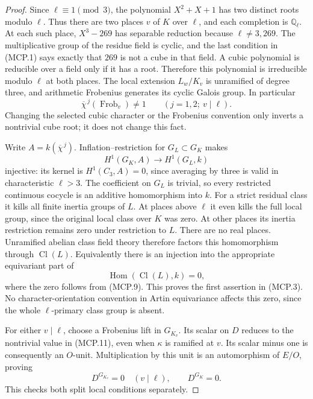 \begin{proof}
Since $\ell\equiv1\pmod3$, the polynomial $X^2+X+1$ has
two distinct roots modulo $\ell$.  Thus there are two places
$v$ of $K$ over $\ell$, and each completion is $\mathbb Q_\ell$.
At each such place, $X^3-269$ has separable reduction because
$\ell\ne3,269$.  The multiplicative group of the residue field
is cyclic, and the last condition in (MCP.1) says exactly that
$269$ is not a cube in that field.  A cubic polynomial is
reducible over a field only if it has a root.  Therefore this
polynomial is irreducible modulo $\ell$ at both places.
The local extension $L_w/K_v$ is unramified of degree three,
and arithmetic Frobenius generates its cyclic Galois group.
In particular
\[
       \overline\chi^{\,j}(\operatorname{Frob}_v)\ne1
                       \qquad(j=1,2;\ v\mid\ell).
 \tag{MCP.11}
\]
Changing the selected cubic character or the Frobenius convention
only inverts a nontrivial cube root; it does not change this fact.

Write $A=k(\overline\chi^{\,j})$.
Inflation--restriction for $G_L\subset G_K$ makes
\[
                       H^1(G_K,A)\longrightarrow H^1(G_L,k)
 \tag{MCP.12}
\]
injective: its kernel is $H^1(C_3,A)=0$, since averaging by
three is valid in characteristic $\ell>3$.
The coefficient on $G_L$ is trivial, so every restricted
continuous cocycle is an additive homomorphism into $k$.
For a strict residual class it kills all finite inertia groups
of $L$.  At places above $\ell$ it even kills the full local
group, since the original local class over $K$ was zero.
At other places its inertia restriction remains zero under
restriction to $L$.  There are no real places.
Unramified abelian class field theory therefore factors this
homomorphism through $\operatorname{Cl}(L)$.  Equivalently there
is an injection into the appropriate equivariant part of
\[
                    \operatorname{Hom}(\operatorname{Cl}(L),k)=0,
 \tag{MCP.13}
\]
where the zero follows from (MCP.9).  This proves the first
assertion in (MCP.3).  No character-orientation convention in
Artin equivariance affects this zero, since the whole
$\ell$-primary class group is absent.

For either $v\mid\ell$, choose a Frobenius lift in $G_{K_v}$.
Its scalar on $D$ reduces to the nontrivial value in (MCP.11),
even when $\kappa$ is ramified at $v$.  Its scalar minus one
is consequently an $O$-unit.  Multiplication by this unit is
an automorphism of $E/O$, proving
\[
                     D^{G_{K_v}}=0\quad(v\mid\ell),
                     \qquad D^{G_K}=0.
 \tag{MCP.14}
\]
This checks both split local conditions separately.


\end{proof}
